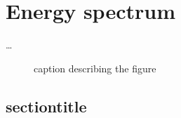 \chapter{Energy spectrum}
\label{chap:Spectrum}
\ldots

\begin{figure}[htbp]
\centering
	\caption{caption describing the figure}
	\label{fig:1}
\end{figure}

\section{sectiontitle}

